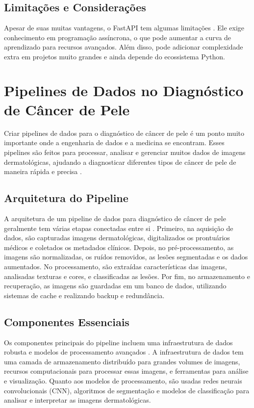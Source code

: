 \subsection{Limitações e Considerações}
Apesar de suas muitas vantagens, o FastAPI tem algumas limitações \cite{kumar2023modern}. Ele exige conhecimento em programação assíncrona, o que pode aumentar a curva de aprendizado para recursos avançados. Além disso, pode adicionar complexidade extra em projetos muito grandes e ainda depende do ecossistema Python.


\section{Pipelines de Dados no Diagnóstico de Câncer de Pele}
Criar pipelines de dados para o diagnóstico de câncer de pele é um ponto muito importante onde a engenharia de dados e a medicina se encontram. Esses pipelines são feitos para processar, analisar e gerenciar muitos dados de imagens dermatológicas, ajudando a diagnosticar diferentes tipos de câncer de pele de maneira rápida e precisa \cite{zhang2021deep}.
\subsection{Arquitetura do Pipeline}
A arquitetura de um pipeline de dados para diagnóstico de câncer de pele geralmente tem várias etapas conectadas entre si \cite{esteva2022deep}. Primeiro, na aquisição de dados, são capturadas imagens dermatológicas, digitalizados os prontuários médicos e coletados os metadados clínicos. Depois, no pré-processamento, as imagens são normalizadas, os ruídos removidos, as lesões segmentadas e os dados aumentados. No processamento, são extraídas características das imagens, analisadas texturas e cores, e classificadas as lesões. Por fim, no armazenamento e recuperação, as imagens são guardadas em um banco de dados, utilizando sistemas de cache e realizando backup e redundância.
\subsection{Componentes Essenciais}
Os componentes principais do pipeline incluem uma infraestrutura de dados robusta e modelos de processamento avançados \cite{kumar2023medical}. A infraestrutura de dados tem uma camada de armazenamento distribuído para grandes volumes de imagens, recursos computacionais para processar essas imagens, e ferramentas para análise e visualização. Quanto aos modelos de processamento, são usadas redes neurais convolucionais (CNN), algoritmos de segmentação e modelos de classificação para analisar e interpretar as imagens dermatológicas.
